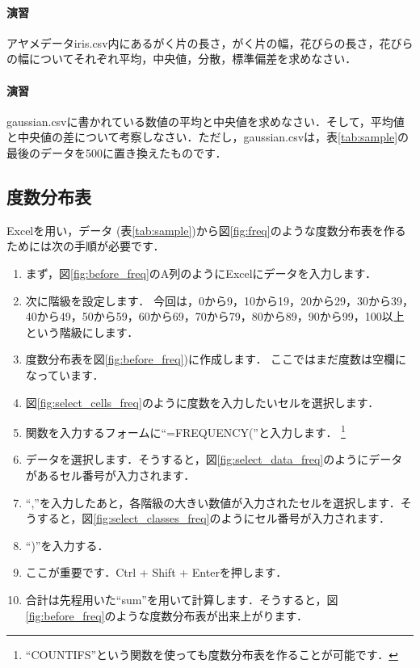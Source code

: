 \paragraph{演習}
アヤメデータiris.csv内にあるがく片の長さ，がく片の幅，花びらの長さ，花びらの幅についてそれぞれ平均，中央値，分散，標準偏差を求めなさい．

\paragraph{演習}
gaussian.csvに書かれている数値の平均と中央値を求めなさい．そして，平均値と中央値の差について考察しなさい．ただし，gaussian.csvは，表\ref{tab:sample}の最後のデータを500に置き換えたものです．

\subsection{度数分布表}
\label{sec:hist}

Excelを用い，データ (表\ref{tab:sample})から図\ref{fig:freq}のような度数分布表を作るためには次の手順が必要です．

\begin{enumerate}
    \item まず，図\ref{fig:before_freq}のA列のようにExcelにデータを入力します．
    \item 次に階級を設定します．
    今回は，0から9，10から19，20から29，30から39，40から49，50から59，60から69，70から79，80から89，90から99，100以上という階級にします．
    \item 度数分布表を図\ref{fig:before_freq})に作成します．
    ここではまだ度数は空欄になっています．
    \item 図\ref{fig:select_cells_freq}のように度数を入力したいセルを選択します．
    \item 関数を入力するフォームに``=FREQUENCY(''と入力します．
    \footnote{``COUNTIFS''という関数を使っても度数分布表を作ることが可能です．}
    \item データを選択します．そうすると，図\ref{fig:select_data_freq}のようにデータがあるセル番号が入力されます．
    \item ``,''を入力したあと，各階級の大きい数値が入力されたセルを選択します．そうすると，図\ref{fig:select_classes_freq}のようにセル番号が入力されます．
    \item ``)''を入力する．
    \item ここが重要です．Ctrl + Shift + Enterを押します．
    \item 合計は先程用いた``sum''を用いて計算します．そうすると，図\ref{fig:before_freq}のような度数分布表が出来上がります．
\end{enumerate}


